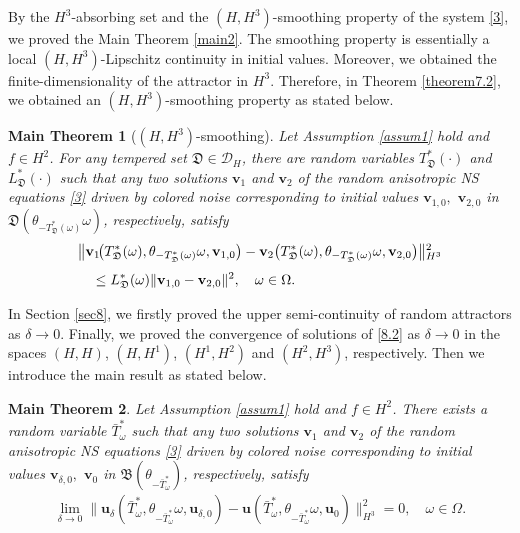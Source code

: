 \documentclass{elsarticle}
\newtheorem{main}{Main Theorem}
\theoremstyle{definition}
\numberwithin{equation}{section}
\newcommand{\D}{\mathcal{D}}
\begin{document}
By the $H^3$-absorbing set and the $(H,H^3)$-smoothing  property of the system \eqref{3}, we proved the Main Theorem \ref{main2}. The smoothing property is essentially a local $(H,H^3)$-Lipschitz continuity in initial values. Moreover, we obtained the finite-dimensionality of the attractor in $H^3$.  Therefore,  in Theorem \ref{theorem7.2}, we obtained an $(H,H^3)$-smoothing property as stated below.

\begin{main}[$(H, H^3)$-smoothing]
 Let Assumption \ref{assum1} hold and $f\in H^2$. For   any tempered set $\mathfrak D \in \D_H$, there
  are  random variables $T_{{\mathfrak D}}^* (\cdot)  $   and $ L_{\mathfrak D}^*(\cdot )$ such that  any two solutions $\textbf{v}_1$ and $\textbf{v}_2$ of the random anisotropic  NS equations \eqref{3} driven by colored noise corresponding to initial values   $\textbf{v}_{1,0},$ $ \textbf{v}_{2,0}$ in $\mathfrak D \left (\theta_{-T_{\mathfrak D}^*(\omega)}\omega \right)$, respectively, satisfy
  \begin{align}
  &
  \big\|\textbf{v}_1 \!  \big (T_{\mathfrak D}^*(\omega),\theta_{-T_{\mathfrak D}^*(\omega)}\omega,\textbf{v}_{1,0}\big)
  -\textbf{v}_2 \big (T_{\mathfrak D}^*(\omega),\theta_{-T_{\mathfrak D}^*(\omega)}\omega,\textbf{v}_{2,0} \big) \big \|{^2_{H^3}}  \notag \\[0.8ex]
&\quad \leq  L_{\mathfrak D}^* (\omega)\|\textbf{v}_{1,0}-\textbf{v}_{2,0}\|^2,\quad \omega\in \Omega.\label{sep5.1}
\end{align}
\end{main}

In Section \ref{sec8}, we firstly proved the upper semi-continuity of random attractors as $\delta\rightarrow0$. Finally, we proved the convergence of solutions of \eqref{8.2}  as $\delta\rightarrow0$ in the spaces $(H,H)$, $(H,H^1)$, $(H^1,H^2)$ and $(H^2,H^3)$, respectively. Then we introduce the main result as stated below.

\begin{main} Let Assumption \ref{assum1} hold and $f\in H^2$. There  exists a  random variable $\bar{T}_\omega^*$  such that   any two solutions $\textbf{v}_1$ and $\textbf{v}_2$ of the random anisotropic  NS equations \eqref{3} driven by colored noise corresponding to initial values  $\textbf{v}_{\delta,0},$ $\textbf{v}_{0}$ in $\mathfrak{B}(\theta_{-\bar{T}_\omega^*})$, respectively,   satisfy
\begin{align*}
 \lim\limits_{\delta\rightarrow0}\|\textbf{u}_\delta(\bar{T}_\omega^*,\theta_{-\bar{T}_\omega^*}\omega,\textbf{u}_{\delta,0})
 -\textbf{u}(\bar{T}_\omega^*,\theta_{-\bar{T}_\omega^*}\omega,\textbf{u}_{0}) \big \|^2_{H^3}=0, \quad \omega\in \Omega.
\end{align*}
\end{main}
\end{document}
